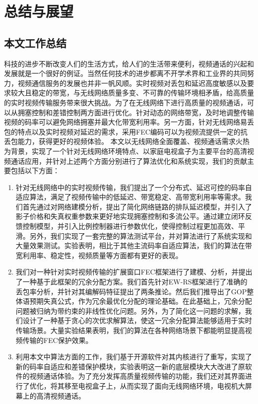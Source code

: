 \chapter{总结与展望}
\label{chap:conclusion}

\section{本文工作总结}
科技的进步不断改变人们的生活方式，给人们的生活带来便利，视频通话的兴起和发展就是一个很好的例证。当然任何技术的进步都离不开学术界和工业界的共同努力，视频通信服务的发展也并非一帆风顺。实时视频对丢包和延迟高度敏感以及要求较大且稳定的带宽，与无线网络质量多变、不可靠的传输环境相矛盾，给高质量的实时视频传输服务带来很大挑战。为了在无线网络下进行高质量的视频通话，可以从拥塞控制和差错控制两方面进行优化。针对动态的网络带宽，及时地调整传输视频的码率可以避免网络拥塞并最大化带宽利用率。另一方面，针对无线网络易丢包的特点以及实时视频对延迟的需求，采用FEC编码可以为视频流提供一定的抗丢包能力，获得更好的视频体验。
本文以无线网络全面覆盖、视频通话需求火热为背景，实现了一个针对无线网络环境特点、以家庭电视盒子为主要平台的高清视频通话应用，并针对上述两个方面分别进行了算法优化和系统实现，我们的贡献主要包括以下方面：
\begin{enumerate}
    \item 针对无线网络中的实时视频传输，我们提出了一个分布式、延迟可控的码率自适应算法，满足了视频传输中的低延迟、带宽稳定、高带宽利用率等需求。我们首先通过对网络建模分析，提出了简化网络链路的排队延迟模型，并引入了影子价格和失真权重参数来更好地实现拥塞控制和多流公平。通过建立闭环反馈控制模型，并引入比例控制器进行参数优化，使得控制过程更加高效、平滑。另外，我们实现了一套完整的算法测试平台，并对算法进行了系统实现和大量效果测试。实验表明，相比于其他主流码率自适应算法，我们的算法在带宽利用率、稳定性，视频质量等方面都有更好的表现。
    \item 我们对一种针对实时视频传输的扩展窗口FEC框架进行了建模、分析，并提出了一种基于此框架的冗余分配方案。我们首先针对EW-RS框架进行了准确的丢包率分析，并针对其编解码特征提出了两条推论。然后我们推导出了GOP整体语预期失真公式，作为冗余最优化分配的理论基础。在此基础上，冗余分配问题被归纳为带约束的非线性优化问题。另外，为了简化这一问题的求解，我们设计了一种基于贪心的次优求解算法，使这一冗余分配算法能够适用于实时传输场景。大量实验结果表明，我们的算法在各种网络场景下都能明显提高视频传输的FEC保护效果。
    \item 利用本文中算法方面的工作，我们基于开源软件对其内核进行了重写，实现了新的码率自适应和差错保护模块，实验表明这一新的底层模块大大改进了原软件的视频通话体验。为了充分发挥高质量视频传输的功能，我们还对其界面进行了优化，将其移至电视盒子上，从而实现了面向无线网络环境，电视机大屏幕上的高清视频通话。
\end{enumerate}


